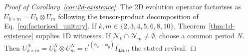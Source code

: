 \begin{proof}[Proof of Corollary~\ref{cor:2d-existence}]
The 2D evolution operator factorises as $U_{k \times m} =
U_k \otimes U_m$ following the tensor-product decomposition
of Eq.~\eqref{eq:factorised_unitary}. If $k, m \in \{2, 3,
4, 5, 6, 8, 10\}$, Theorem~\ref{thm:1d-existence} supplies
1D witnesses. If $\mathcal{N}_k \cap \mathcal{N}_m \neq
\emptyset$, choose a common period $N$. Then
$U_{k \times m}^N = U_k^N \otimes U_m^N = e^{i(\phi_x +
\phi_y)} I_{4km}$, the stated revival.
\end{proof}
